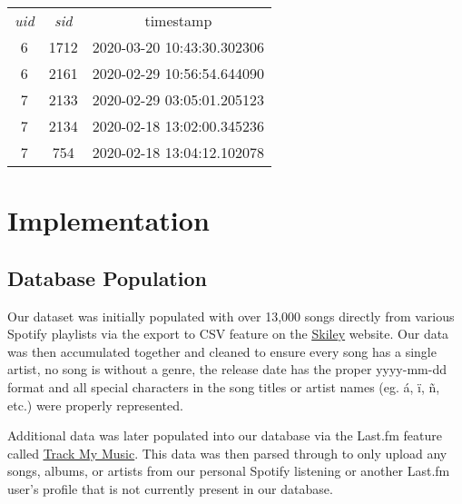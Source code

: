 \documentclass[12pt]{article}
\begin{document}
    \begin{center}
        \begin{tabular}{ |c|c|c| }
            \hline
            \rowcolor{tablegrey} \multicolumn{3}{|c|}{Play} \\
            \hline
            \emph{uid} & \emph{sid} & timestamp \\
            \hline
            6 & 1712 & 2020-03-20 10:43:30.302306 \\
            \hline
            6 & 2161 & 2020-02-29 10:56:54.644090 \\
            \hline
            7 & 2133 & 2020-02-29 03:05:01.205123 \\
            \hline
            7 & 2134 & 2020-02-18 13:02:00.345236 \\
            \hline
            7 & 754 & 2020-02-18 13:04:12.102078 \\
            \hline
        \end{tabular}
    \end{center}



    \section{Implementation}

    \subsection{Database Population}
    Our dataset was initially populated with over 13,000 songs directly from various Spotify playlists
    via the export to CSV feature on the \underline{\href{https://skiley.net/}{Skiley}} website.
    Our data was then accumulated together and cleaned to ensure every song has a single artist, no song
    is without a genre, the release date has the proper yyyy-mm-dd format and all special characters
    in the song titles or artist names (eg. \'{a}, \"{i}, \~{n}, etc.) were properly represented.

    \vspace{0.5cm}

    \noindent Additional data was later populated into our database via the Last.fm feature called
    \underline{\href{https://www.last.fm/about/trackmymusic}{Track My Music}}. This data was
    then parsed through to only upload any songs, albums, or artists from our personal Spotify
    listening or another Last.fm user's profile that is not currently present in our database.
\end{document}
